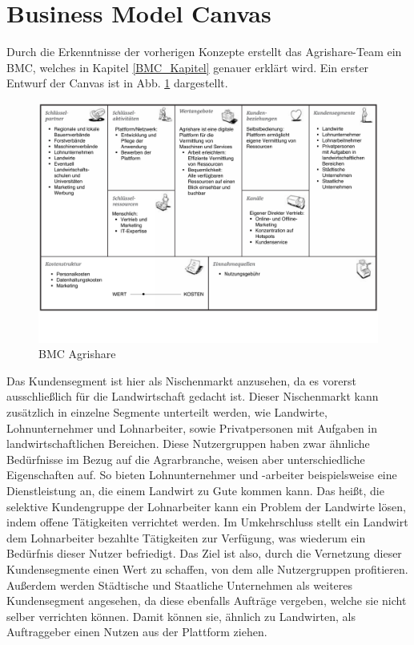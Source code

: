 \section{Business Model Canvas}
Durch die Erkenntnisse der vorherigen Konzepte erstellt das Agrishare-Team ein \ac{BMC}, welches in Kapitel \ref{BMC_Kapitel} genauer erklärt wird. Ein erster Entwurf der Canvas ist in Abb. \ref{BMC_Agrishare} dargestellt.
\begin{figure}[h!]
		\includegraphics[angle=90,origin=c,width=\textwidth]{99_PDF_INCLUDE/BMC_draft.pdf}
		\caption{\ac{BMC} Agrishare}
		\label{BMC_Agrishare}
\end{figure}

Das Kundensegment ist hier als Nischenmarkt anzusehen, da es vorerst ausschließlich für die Landwirtschaft gedacht ist. Dieser Nischenmarkt kann zusätzlich in einzelne Segmente unterteilt werden, wie Landwirte, Lohnunternehmer und Lohnarbeiter, sowie Privatpersonen mit Aufgaben in landwirtschaftlichen Bereichen. Diese Nutzergruppen haben zwar ähnliche Bedürfnisse im Bezug auf die Agrarbranche, weisen aber unterschiedliche Eigenschaften auf. So bieten Lohnunternehmer und -arbeiter beispielsweise eine Dienstleistung an, die einem Landwirt zu Gute kommen kann. Das heißt, die selektive Kundengruppe der Lohnarbeiter kann ein Problem der Landwirte lösen, indem offene Tätigkeiten verrichtet werden. Im Umkehrschluss stellt ein Landwirt dem Lohnarbeiter bezahlte Tätigkeiten zur Verfügung, was wiederum ein Bedürfnis dieser Nutzer befriedigt. Das Ziel ist also, durch die Vernetzung dieser Kundensegmente einen Wert zu schaffen, von dem alle Nutzergruppen profitieren. Außerdem werden Städtische und Staatliche Unternehmen als weiteres Kundensegment angesehen, da diese ebenfalls Aufträge vergeben, welche sie nicht selber verrichten können. Damit können sie, ähnlich zu Landwirten, als Auftraggeber einen Nutzen aus der Plattform ziehen.

